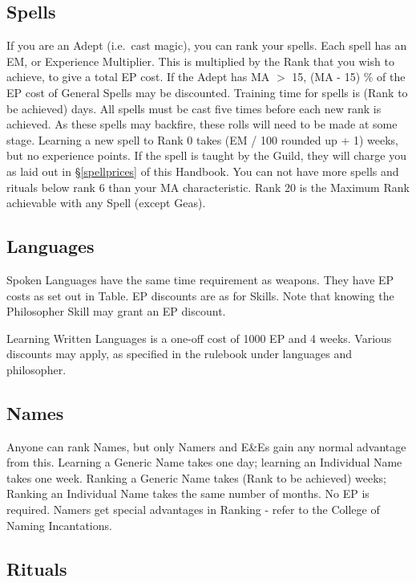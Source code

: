 \documentclass[twoside,a4paper]{article}
\begin{document}
\begin{multicols}{2}
\subsection{Spells}

If you are an Adept (i.e.\ cast magic), you can rank your spells.
Each spell has an EM, or Experience Multiplier. This is multiplied by
the Rank that you wish to achieve, to give a total EP cost. If the
Adept has MA $>$ 15, (MA - 15) \% of the EP cost of General Spells
may be discounted. Training time for spells is (Rank to be achieved)
days.  All spells must be cast five times before each new rank is
achieved. As these spells may backfire, these rolls will need to be
made at some stage.  Learning a new spell to Rank 0 takes (EM / 100
rounded up + 1) weeks, but no experience points. If the spell is
taught by the Guild, they will charge you as laid out in
\S\ref{spellprices} of this Handbook.  You can not have more spells
and rituals below rank 6 than your MA characteristic.  Rank 20 is the
Maximum Rank achievable with any Spell (except Geas).

\subsection{Languages}

Spoken Languages have the same time requirement as weapons. They have
EP costs as set out in Table. EP discounts are as for Skills. Note
that knowing the Philosopher Skill may grant an EP discount.

Learning Written Languages is a one-off cost of 1000 EP and 4
weeks. Various discounts may apply, as specified in the rulebook under
languages and philosopher.

\subsection{Names}

Anyone can rank Names, but only Namers and E\&Es gain any normal
advantage from this.  Learning a Generic Name takes one day; learning
an Individual Name takes one week. Ranking a Generic Name takes (Rank
to be achieved) weeks; Ranking an Individual Name takes the same
number of months. No EP is required. Namers get special advantages in
Ranking - refer to the College of Naming Incantations.

\subsection{Rituals}


\end{multicols}
\end{document}
